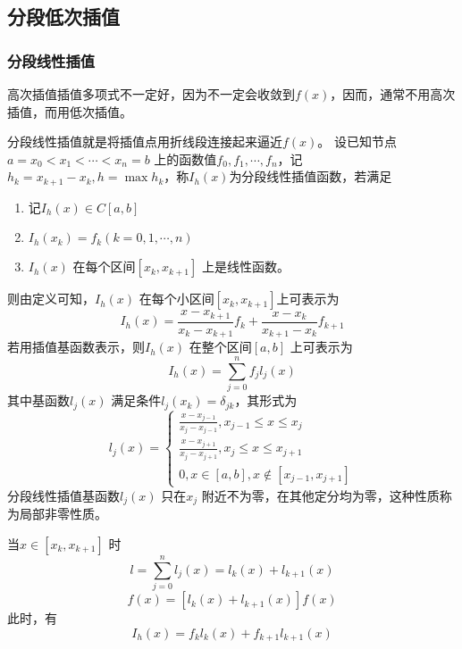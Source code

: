 \documentclass[a4paper]{article}
\begin{document}
\subsection{分段低次插值}
\subsubsection{分段线性插值}
高次插值插值多项式不一定好，因为不一定会收敛到$f(x)$，因而，通常不用高次插值，而用低次插值。

分段线性插值就是将插值点用折线段连接起来逼近$f(x)$。
设已知节点$a = x_0 < x_1 < \cdots < x_{n} = b$ 上的函数值$f_0, f_1, \cdots, f_n$，记$h_k = x_{k+1} - x_{k}, h = \max h_k$，称$I_h(x)$为分段线性插值函数，若满足
 \begin{enumerate}
	 \item 记$I_h(x) \in C[a, b]$ 
	 \item $I_h(x_{k}) = f_k (k=0,1,\cdots,n)$ 
	 \item $I_h(x)$ 在每个区间$[x_{k}, x_{k+1}]$ 上是线性函数。
\end{enumerate}
则由定义可知，$I_h(x)$ 在每个小区间$[x_{k}, x_{k+1}]$上可表示为
\[
	I_h(x) = \frac{x - x_{k+1}}{x_{k} - x_{k+1}} f_k + \frac{x - x_k}{x_{k+1} - x_{k}} f_{k+1} \tag{1.6.1} \label{eq:1.6.1}
\] 
若用插值基函数表示，则$I_h(x)$ 在整个区间$[a,b]$ 上可表示为
\[
	I_h(x) = \sum_{j=0}^{n} f_j l_j(x) \tag{1.6.2} \label{eq:1.6.2}
\] 
其中基函数$l_j(x)$ 满足条件$l_j(x_{k}) = \delta_{jk}$，其形式为
\[
	\tag{1.6.3} \label{eq:1.6.3}
	l_j(x) = 
	\begin{cases}
		\frac{x - x_{j-1}}{x_{j} - x_{j-1}}, x_{j-1} \le x \le  x_{j} \\
		\frac{x - x_{j+1}}{x_{j} - x_{j+1}}, x_{j} \le  x \le x_{j+1} \\
		0, x \in [a,b], x \not\in [x_{j-1}, x_{j+1}]
	\end{cases}
\] 
分段线性插值基函数$l_j(x)$ 只在$x_{j}$ 附近不为零，在其他定分均为零，这种性质称为局部非零性质。

当$x \in [x_{k}, x_{k+1}]$ 时 
\[
	l = \sum_{j=0}^{n} l_j(x) = l_k(x) + l_{k+1}(x)
\] 
\[
	f(x) = [l_k(x) + l_{k+1}(x)] f(x)
\] 
此时，有
\[
	I_h(x) = f_k l_k(x) + f_{k+1} l_{k+1}(x)
\] 
\end{document}
